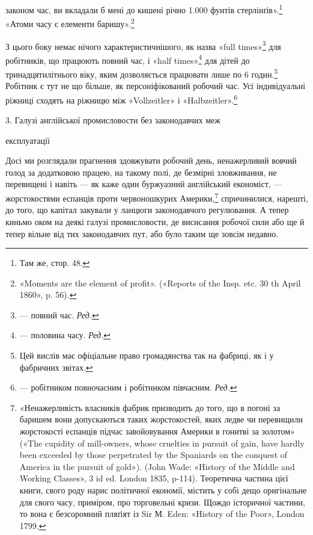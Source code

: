 \parcont{}  %
законом час, ви вкладали б мені до кишені річно 1.000 фунтів
стерлінґів».\footnote{
Там же, стор. 48.
} «Атоми часу є елементи баришу».\footnote{
«Moments are the element of profit». («Reports of the Insp. etc.
30 th April 1860», p. 56).
}

З цього боку немає нічого характеристичнішого, як назва
«full times»\footnote*{
— повний час. \emph{Ред.}
} для робітників, що працюють повний час, і «half
times»\footnote*{
— половина часу. \emph{Ред.}
} для дітей до тринадцятилітнього віку, яким дозволяється
працювати лише по 6 годин.\footnote{
Цей вислів має офіціальне право громадянства так на фабриці,
як і у фабричних звітах.
} Робітник є тут не що більше,
як персоніфікований робочий час. Усі індивідуальні ріжниці
сходять на ріжницю між «Vollzeitler» і «Halbzeitler».\footnote*{
— робітником повночасним і робітником півчасним. \emph{Ред.}
}

3. Галузі англійської промисловостн без законодавчих меж

експлуатації

Досі ми розглядали прагнення здовжувати робочий день,
ненажерливий вовчий голод за додатковою працею, на такому
полі, де безмірні зловживання, не перевищені і навіть — як каже
один буржуазний англійський економіст, — жорстокостями еспанців
проти червоношкурих Америки,\footnote{
«Ненажерливість власників фабрик призводить до того, що в погоні
за баришем вони допускаються таких жорстокостей, яких ледве чи
перевищили жорстокості еспанців підчас завойовування Америки в гонитві
за золотом» («The cupidity of mill-owners, whose cruelties in pursuit
of gain, have hardly been exceeded by those perpetrated by the Spaniards
on the conquest of America in the pursuit of gold»). (John Wade:
«History of the Middle and Working Classes», 3 id ed. London 1835, p-114).
Теоретична частина цієї книги, свого роду нарис політичної економії,
містить у собі дещо оригінальне для свого часу, приміром, про торговельні
кризи. Щождо історичної частини, то вона є безсоромний пляґіят із Sir
М. Eden: «History of the Poor», London 1799.
} спричинилися, нарешті,
до того, що капітал закували у ланцюги законодавчого регулювання.
А тепер киньмо оком на деякі галузі промисловости, де
висисання робочої сили або ще й тепер вільне від тих законодавчих
пут, або було таким ще зовсім недавно.

